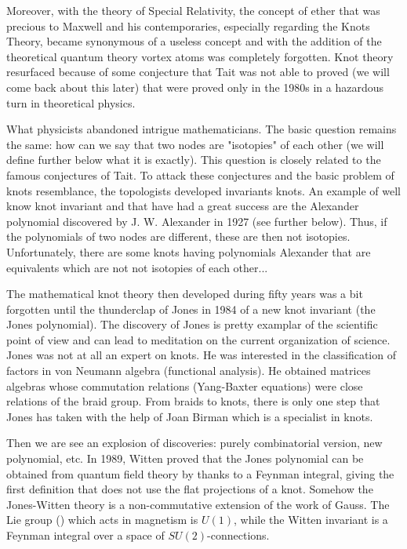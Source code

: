 {	Moreover, with the theory of Special Relativity, the concept of ether that was precious to Maxwell and his contemporaries, especially regarding the Knots Theory, became synonymous of a useless concept and with the addition of the theoretical quantum theory vortex atoms was completely forgotten. Knot theory resurfaced because of some conjecture that Tait was not able to proved (we will come back about this later) that were proved only in the 1980s in a hazardous turn in theoretical physics.
	
	What physicists abandoned intrigue mathematicians. The basic question remains the same: how can we say that two nodes are "isotopies" of each other (we will define further below what it is exactly). This question is closely related to the famous conjectures of Tait. To attack these conjectures and the basic problem of knots resemblance, the topologists developed invariants knots. An example of well know knot invariant and that have had  a great success are the Alexander polynomial discovered by J. W. Alexander in 1927 (see further below). Thus, if the polynomials of two nodes are different, these are then not isotopies. Unfortunately, there are some knots having polynomials Alexander that are equivalents which are not not isotopies of each other...
	
	The mathematical knot theory then developed during fifty years was a bit forgotten until the thunderclap of Jones in 1984 of a new knot invariant (the Jones polynomial). The discovery of Jones is pretty examplar of the scientific point of view and can lead to meditation on the current organization of science. Jones was not at all an expert on knots. He was interested in the classification of factors in von Neumann algebra (functional analysis). He obtained matrices algebras whose commutation relations (Yang-Baxter equations) were close relations of the braid group. From braids to knots, there is only one step that Jones has taken with the help of Joan Birman which is a specialist in knots.
	
	Then we are see an explosion of discoveries: purely combinatorial version, new polynomial, etc. In 1989, Witten proved that the Jones polynomial can be obtained from quantum field theory by thanks to a Feynman integral, giving the first definition that does not use the flat projections of a knot. Somehow the Jones-Witten theory is a non-commutative extension of the work of Gauss. The Lie group () which acts in magnetism is $U(1)$, while the Witten invariant is a Feynman integral over a space of $SU(2)$-connections.
	
}
